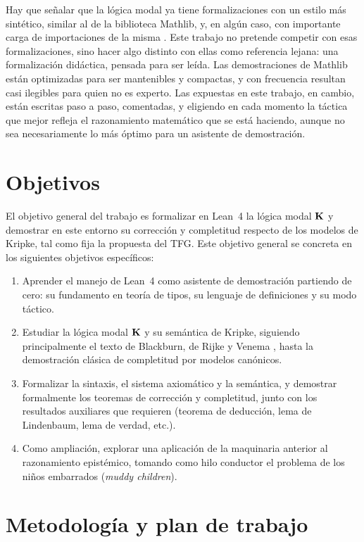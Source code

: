 Hay que señalar que la lógica modal ya tiene formalizaciones con un estilo más sintético, similar al de la biblioteca Mathlib, y, en algún caso, con importante carga de importaciones de la misma \cite{foundation, wugore}. Este trabajo no pretende competir con esas formalizaciones, sino hacer algo distinto con ellas como referencia lejana: una formalización didáctica, pensada para ser leída. Las demostraciones de Mathlib están optimizadas para ser mantenibles y compactas, y con frecuencia resultan casi ilegibles para quien no es experto. Las expuestas en este trabajo, en cambio, están escritas paso a paso, comentadas, y eligiendo en cada momento la táctica que mejor refleja el razonamiento matemático que se está haciendo, aunque no sea necesariamente lo más óptimo para un asistente de demostración.

\section{Objetivos}

El objetivo general del trabajo es formalizar en Lean~4 la lógica modal $\mathbf{K}$ y demostrar en este entorno su corrección y completitud respecto de los modelos de Kripke, tal como fija la propuesta del TFG. Este objetivo general se concreta en los siguientes objetivos específicos:

\begin{enumerate}
  \item Aprender el manejo de Lean~4 como asistente de demostración partiendo de cero: su fundamento en teoría de tipos, su lenguaje de definiciones y su modo táctico.
  \item Estudiar la lógica modal $\mathbf{K}$ y su semántica de Kripke, siguiendo principalmente el texto de Blackburn, de Rijke y Venema \cite{blackburn}, hasta la demostración clásica de completitud por modelos canónicos.
  \item Formalizar la sintaxis, el sistema axiomático y la semántica, y demostrar formalmente los teoremas de corrección y completitud, junto con los resultados auxiliares que requieren (teorema de deducción, lema de Lindenbaum, lema de verdad, etc.).
  \item Como ampliación, explorar una aplicación de la maquinaria anterior al razonamiento epistémico, tomando como hilo conductor el problema de los niños embarrados (\emph{muddy children}).
\end{enumerate}

\section{Metodología y plan de trabajo}

